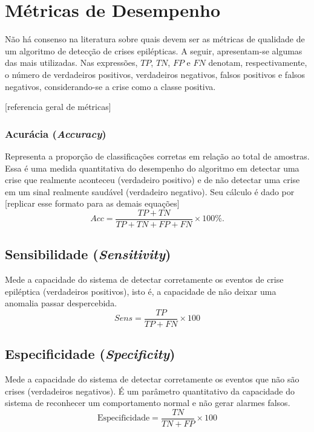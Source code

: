 \documentclass[]{article}
\begin{document}
	\section{Métricas de Desempenho}
	\label{sec:metricas}
	\noindent
	Não há consenso na literatura sobre quais devem ser as métricas de qualidade de um algoritmo de detecção de crises epilépticas. A seguir, apresentam-se algumas das mais utilizadas. Nas expressões, $TP$, $TN$, $FP$ e $FN$ denotam, respectivamente, o número de verdadeiros positivos, verdadeiros negativos, falsos positivos e falsos negativos, considerando-se a crise como a classe positiva.

	[referencia geral de métricas]
	\subsubsection*{Acurácia (\textit{Accuracy})}
	\noindent
	Representa a proporção de classificações corretas em relação ao total de amostras. Essa é uma medida quantitativa do desempenho do algoritmo em detectar uma crise que realmente aconteceu (verdadeiro positivo) e de não detectar uma crise em um sinal realmente saudável (verdadeiro negativo). Seu cálculo é dado por
	[replicar esse formato para as demais equações]
	\begin{equation}
		Acc = \frac{TP + TN}{TP + TN + FP + FN} \times 100\%. 
	\end{equation}

	\subsection{Sensibilidade (\textit{Sensitivity})}
	\noindent
	Mede a capacidade do sistema de detectar corretamente os eventos de crise epiléptica (verdadeiros positivos), isto é, a capacidade de não deixar uma anomalia passar despercebida.
	\begin{equation}
		Sens = \frac{TP}{TP + FN} \times 100
	\end{equation}

	\subsection{Especificidade (\textit{Specificity})}
	\noindent
	Mede a capacidade do sistema de detectar corretamente os eventos que não são crises (verdadeiros negativos). É um parâmetro quantitativo da capacidade do sistema de reconhecer um comportamento normal e não gerar alarmes falsos.
	\begin{equation}
		\text{Especificidade} = \frac{TN}{TN + FP} \times 100
	\end{equation}
\end{document}
